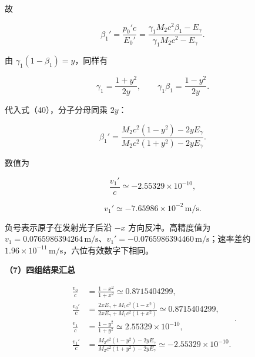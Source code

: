 \documentclass[12pt,a4paper,UTF8]{ctexart}
\begin{document}
故

\[
\boxed{
\beta_1'
=\frac{p_0'c}{E_0'}
=\frac{\gamma_1M_2c^2\beta_1-E_\gamma}
{\gamma_1M_2c^2-E_\gamma}
}.
\tag{40}
\]

由 \(\gamma_1(1-\beta_1)=y\)，同样有

\[
\gamma_1=\frac{1+y^2}{2y},
\qquad
\gamma_1\beta_1=\frac{1-y^2}{2y}.
\tag{41}
\]

代入式（40），分子分母同乘 \(2y\)：

\[
\boxed{
\beta_1'
=\frac{M_2c^2(1-y^2)-2yE_\gamma}
{M_2c^2(1+y^2)-2yE_\gamma}
}.
\tag{42}
\]

数值为

\[
\boxed{
\frac{v_1'}c
\simeq-2.55329\times10^{-10}
},
\tag{43}
\]

\[
\boxed{
v_1'\simeq-7.65986\times10^{-2}\,\mathrm{m/s}
}.
\tag{44}
\]

负号表示原子在发射光子后沿 \(-x\) 方向反冲。高精度值为
\(v_1=0.0765986394264\,\mathrm{m/s}\)、\(v_1'= -0.0765986394460\,\mathrm{m/s}\)；速率差约
\(1.96\times10^{-11}\,\mathrm{m/s}\)，六位有效数字下相同。

\textbf{（7）四组结果汇总}

\[
\boxed{
\begin{aligned}
\frac{v_0}{c}&=\frac{1-x^2}{1+x^2}
\simeq0.8715404299,\\
\frac{v_0'}{c}
&=\frac{2xE_\gamma+M_1c^2(1-x^2)}
{2xE_\gamma+M_1c^2(1+x^2)}
\simeq0.8715404299,\\
\frac{v_1}{c}&=\frac{1-y^2}{1+y^2}
\simeq2.55329\times10^{-10},\\
\frac{v_1'}{c}
&=\frac{M_2c^2(1-y^2)-2yE_\gamma}
{M_2c^2(1+y^2)-2yE_\gamma}
\simeq-2.55329\times10^{-10}.
\end{aligned}
}.
\tag{45}
\]
\end{document}
